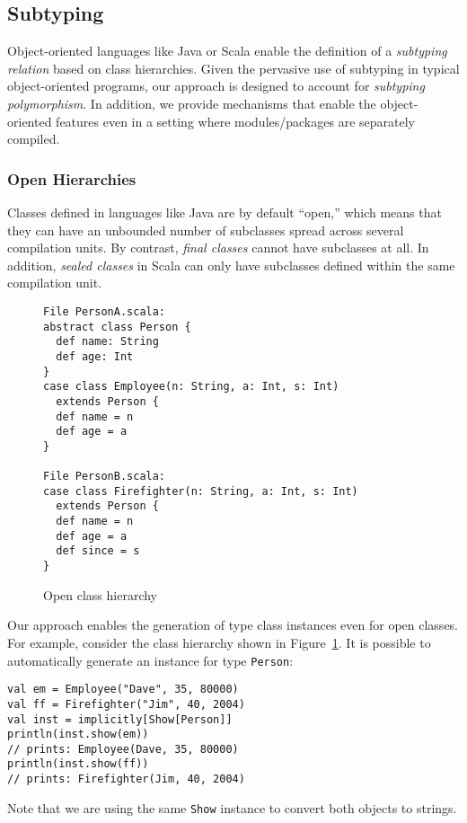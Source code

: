 \documentclass[preprint]{sigplanconf}
\begin{document}
\subsection{Subtyping}

Object-oriented languages like Java or Scala enable the definition of a
\emph{subtyping relation} based on class hierarchies. Given the pervasive use
of subtyping in typical object-oriented programs, our approach is designed to
account for \emph{subtyping polymorphism}. In addition, we provide mechanisms
that enable the object-oriented features even in a setting where
modules/packages are separately compiled.

\subsubsection{Open Hierarchies}

Classes defined in languages like Java are by default ``open,'' which means
that they can have an unbounded number of subclasses spread across several
compilation units. By contrast, \emph{final classes} cannot have subclasses at
all. In addition, \emph{sealed classes} in Scala can only have subclasses
defined within the same compilation unit.

\begin{figure}
\centering
\begin{lstlisting}
File PersonA.scala:
abstract class Person {
  def name: String
  def age: Int
}
case class Employee(n: String, a: Int, s: Int)
  extends Person {
  def name = n
  def age = a
}

File PersonB.scala:
case class Firefighter(n: String, a: Int, s: Int)
  extends Person {
  def name = n
  def age = a
  def since = s
}
\end{lstlisting}
  \caption{Open class hierarchy}
  \label{fig:class-hierarchy}
\end{figure}

Our approach enables the generation of type class instances even for open
classes. For example, consider the class hierarchy shown in
Figure~\ref{fig:class-hierarchy}. It is possible to automatically generate
an instance for type \verb|Person|:

\begin{lstlisting}
val em = Employee("Dave", 35, 80000)
val ff = Firefighter("Jim", 40, 2004)
val inst = implicitly[Show[Person]]
println(inst.show(em))
// prints: Employee(Dave, 35, 80000)
println(inst.show(ff))
// prints: Firefighter(Jim, 40, 2004)
\end{lstlisting}
\noindent
Note that we are using the same \verb|Show| instance to convert both objects
to strings.
\end{document}
